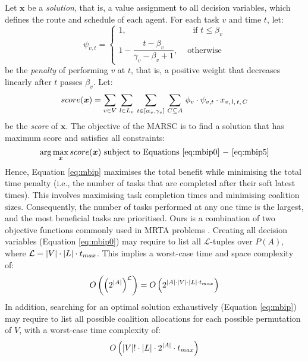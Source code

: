Let $\bm{x}$ be a \emph{solution}, that is, a value assignment to all decision variables,
which defines the route and schedule of each agent. For each task $v$ and time $t$, let:
\begin{equation}\label{eq:penalty}
\psi_{v, t} =
\begin{cases}
    1, & \quad\text{if } t \leq \beta_v\\
    1 - \dfrac{t - \beta_v}{\gamma_v - \beta_v + 1}, & \text{ otherwise}
\end{cases}
\end{equation}
be the \emph{penalty} of performing $v$ at $t$, that is, a positive weight that decreases
linearly after $t$ passes $\beta_v$. Let:
\begin{equation}\label{eq:score}
    score(\bm{x}) =
    \sum_{v \in V}\, \sum_{l \in L_v}\, \sum_{t \in [\alpha_v, \gamma_v]}\,
    \sum_{C \subseteq A}\, \phi_v \cdot \psi_{v, t} \cdot x_{v,\, l,\, t,\, C}
\end{equation}
be the \emph{score} of $\bm{x}$.
The objective of the MARSC is to find a solution that has maximum score and satisfies all
constraints:
\begin{equation}\label{eq:mbip}
    \arg \max_{\bm{x}} score(\bm{x})
    \text{ subject to Equations \ref{eq:mbip0} $-$ \ref{eq:mbip5}}
\end{equation}
Hence, Equation \ref{eq:mbip} maximises the total benefit while minimising the total time
penalty (i.e., the number of tasks that are completed after their soft latest times).
This involves maximising task completion times and minimising coalition sizes.
Consequently, the number of tasks performed at any one time is the largest, and the most
beneficial tasks are prioritised. Ours is a combination of two objective functions
commonly used in MRTA problems \cite[Section $5$]{nunes2017taxonomy}.
Creating all decision variables (Equation \ref{eq:mbip0}) may require to list all
$\mathcal{L}$-tuples over $P(A)$, where $\mathcal{L} = |V| \cdot |L| \cdot
t_{max}$. This implies a worst-case time and space complexity of:
\begin{equation}\label{eq:mccc}
    O\left( {\left(2^{|A|}\right)}^{\mathcal{L}} \right) =
    O\left( 2^{|A| \cdot |V| \cdot |L| \cdot t_{max}} \right)
\end{equation}
In addition, searching for an optimal solution exhaustively (Equation \ref{eq:mbip}) may
require to list all possible coalition allocations for each possible permutation of $V$,
with a worst-case time complexity of:
\begin{equation}\label{eq:mcomp}
    O \left( |V|! \cdot |L| \cdot 2^{|A|} \cdot t_{max} \right)
\end{equation}

